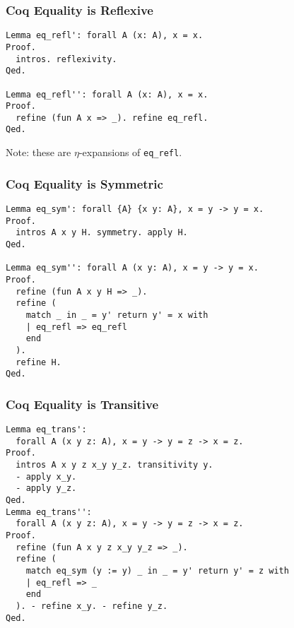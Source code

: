 \documentclass{beamer}
\begin{document}
\begin{frame}[fragile]
  \frametitle{Coq Equality is Reflexive}

\begin{verbatim}
Lemma eq_refl': forall A (x: A), x = x.
Proof.
  intros. reflexivity.
Qed.

Lemma eq_refl'': forall A (x: A), x = x.
Proof.
  refine (fun A x => _). refine eq_refl.
Qed.
\end{verbatim}
\vfill

Note: these are \(\eta\)-expansions of \texttt{eq_refl}.
\end{frame}
\begin{frame}[fragile]
  \frametitle{Coq Equality is Symmetric}

\begin{verbatim}
Lemma eq_sym': forall {A} {x y: A}, x = y -> y = x.
Proof.
  intros A x y H. symmetry. apply H.
Qed.

Lemma eq_sym'': forall A (x y: A), x = y -> y = x.
Proof.
  refine (fun A x y H => _).
  refine (
    match _ in _ = y' return y' = x with
    | eq_refl => eq_refl
    end
  ).
  refine H.
Qed.
\end{verbatim}
\end{frame}
\begin{frame}[fragile]
  \frametitle{Coq Equality is Transitive}

\begin{verbatim}
Lemma eq_trans':
  forall A (x y z: A), x = y -> y = z -> x = z.
Proof.
  intros A x y z x_y y_z. transitivity y.
  - apply x_y.
  - apply y_z.
Qed.
Lemma eq_trans'':
  forall A (x y z: A), x = y -> y = z -> x = z.
Proof.
  refine (fun A x y z x_y y_z => _).
  refine (
    match eq_sym (y := y) _ in _ = y' return y' = z with
    | eq_refl => _
    end
  ). - refine x_y. - refine y_z.
Qed.
\end{verbatim}
\end{frame}
\end{document}

